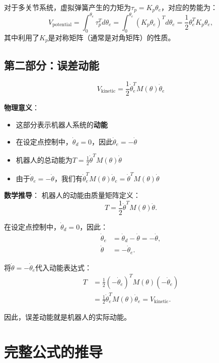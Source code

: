 \documentclass{article}
\begin{document}
对于多关节系统，虚拟弹簧产生的力矩为$\tau_p = K_p\theta_e$，对应的势能为：
\begin{equation}
V_{\text{potential}} = \int_0^{\theta_e} \tau_p^T d\theta_e = \int_0^{\theta_e} (K_p\theta_e)^T d\theta_e = \frac{1}{2}\theta_e^T K_p\theta_e,
\end{equation}
其中利用了$K_p$是对称矩阵（通常是对角矩阵）的性质。

\subsection{第二部分：误差动能}

\begin{equation}
V_{\text{kinetic}} = \frac{1}{2}\dot{\theta}_e^T M(\theta)\dot{\theta}_e
\end{equation}

\textbf{物理意义}：
\begin{itemize}
\item 这部分表示机器人系统的\textbf{动能}
\item 在设定点控制中，$\dot{\theta}_d = 0$，因此$\dot{\theta}_e = -\dot{\theta}$
\item 机器人的总动能为$T = \frac{1}{2}\dot{\theta}^T M(\theta)\dot{\theta}$
\item 由于$\dot{\theta}_e = -\dot{\theta}$，我们有$\dot{\theta}_e^T M(\theta)\dot{\theta}_e = \dot{\theta}^T M(\theta)\dot{\theta}$
\end{itemize}

\textbf{数学推导}：
机器人的动能由质量矩阵定义：
\begin{equation}
T = \frac{1}{2}\dot{\theta}^T M(\theta)\dot{\theta}.
\end{equation}

在设定点控制中，$\dot{\theta}_d = 0$，因此：
\begin{align}
\dot{\theta}_e &= \dot{\theta}_d - \dot{\theta} = -\dot{\theta}, \\
\dot{\theta} &= -\dot{\theta}_e.
\end{align}

将$\dot{\theta} = -\dot{\theta}_e$代入动能表达式：
\begin{align}
T &= \frac{1}{2}(-\dot{\theta}_e)^T M(\theta)(-\dot{\theta}_e) \\
  &= \frac{1}{2}\dot{\theta}_e^T M(\theta)\dot{\theta}_e = V_{\text{kinetic}}.
\end{align}

因此，误差动能就是机器人的实际动能。

\section{完整公式的推导}
\end{document}
